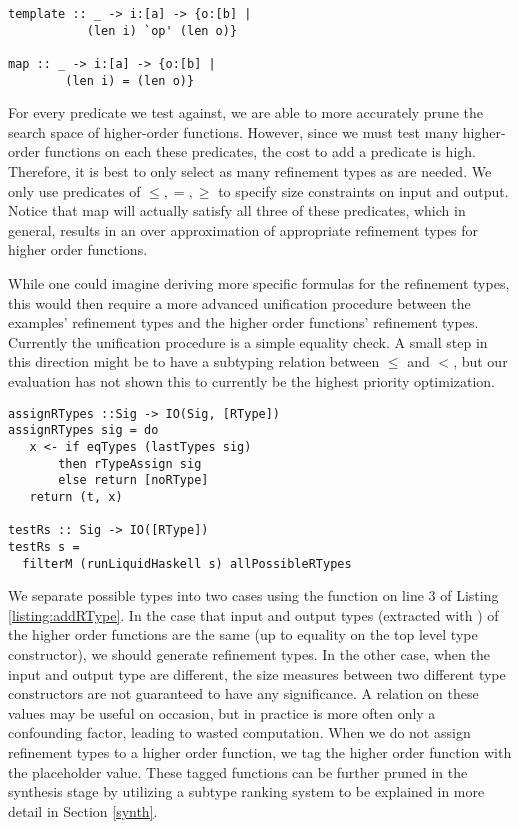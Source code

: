 \begin{lstlisting}[numbers=none]
template :: _ -> i:[a] -> {o:[b] |
           (len i) `op' (len o)}
        
map :: _ -> i:[a] -> {o:[b] |
        (len i) = (len o)}
\end{lstlisting}


For every predicate  we test against, we are able to more accurately prune the search space of higher-order functions.
However, since we must test many higher-order functions on each these predicates, the cost to add a predicate is high.
Therefore, it is best to only select as many refinement types as are needed.
We only use predicates of $\leq,=,\geq$ to specify size constraints on input and output.
Notice that map will actually satisfy all three of these predicates, which in general, results in an over approximation of appropriate refinement types for higher order functions.

While one could imagine deriving more specific formulas for the refinement types, this would then require a more advanced unification procedure between the examples' refinement types and the higher order functions' refinement types.
Currently the unification procedure is a simple equality check.
A small step in this direction might be to have a subtyping relation between $\leq$ and $<$, but our evaluation has not shown this to currently be the highest priority optimization.


\begin{lstlisting}[caption=Adding refinement types to higher order functions,label=listing:addRType]
assignRTypes ::Sig -> IO(Sig, [RType])
assignRTypes sig = do
   x <- if eqTypes (lastTypes sig) 
       then rTypeAssign sig
       else return [noRType]
   return (t, x)

testRs :: Sig -> IO([RType])
testRs s =
  filterM (runLiquidHaskell s) allPossibleRTypes
\end{lstlisting}

We separate possible types into two cases using the  function on line 3 of Listing \ref{listing:addRType}.
In the case that input and output types (extracted with ) of the higher order functions are the same (up to equality on the top level type constructor), we should generate refinement types.
In the other case, when the input and output type are different, the size measures between two different type constructors are not guaranteed to have any significance.
A relation on these values may be useful on occasion, but in practice is more often only a confounding factor, leading to wasted computation.
When we do not assign refinement types to a higher order function, we tag the higher order function with the placeholder  value.
These  tagged functions can be further pruned in the synthesis stage by utilizing a subtype ranking system to be explained in more detail in Section \ref{synth}.

